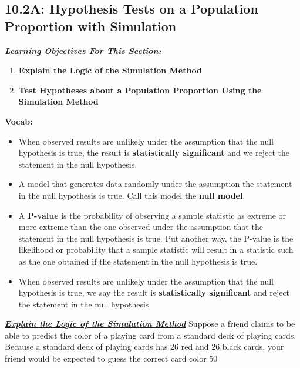 \documentclass{report}
\begin{document}
    \subsection*{10.2A: Hypothesis Tests on a Population Proportion with Simulation}
    \bigbreak \noindent 
    \bigbreak \noindent 
    \textbf{\textit{\underline{Learning Objectives For This Section:}}}
    \begin{enumerate}
        \item \textbf{Explain the Logic of the Simulation Method}
        \item \textbf{Test Hypotheses about a Population Proportion Using the Simulation Method}
    \end{enumerate}
    \bigbreak \noindent 
    \textbf{Vocab:}
    \begin{itemize}
        \item When observed results are unlikely under the assumption that the null hypothesis is true, the result is \textbf{statistically significant} and we reject the statement in the null hypothesis.
        \item A model that generates data randomly under the assumption the statement in the null hypothesis is true. Call this model the \textbf{null model}. 
        \item A \textbf{P-value} is the probability of observing a sample statistic as extreme or more extreme than the one observed under the assumption that the statement in the null hypothesis is true. Put another way, the P-value is the likelihood or probability that a sample statistic will result in a statistic such as the one obtained if the statement in the null hypothesis is true.
        \item When observed results are unlikely under the assumption that the null hypothesis is true, we say the result is \textbf{statistically significant} and reject the statement in the null hypothesis
    \end{itemize}
    \pagebreak \bigbreak \noindent 
    \textbf{\textit{\underline{Explain the Logic of the Simulation Method}}}
    \bigbreak \noindent 
    Suppose a friend claims to be able to predict the color of a playing card from a standard deck of playing cards. Because a standard deck of playing cards has 26 red and 26 black cards, your friend would be expected to guess the correct card color 50%
\end{document}
